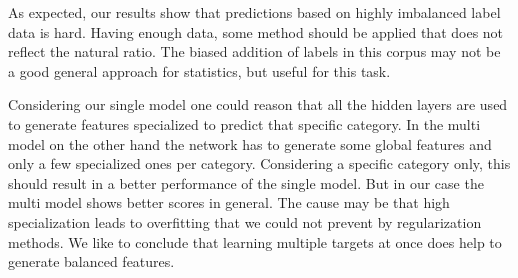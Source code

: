 \documentclass[11pt,a4paper]{article}
\begin{document}
As expected, our results show that predictions based on highly imbalanced label data is hard. Having enough data, some method should be applied that does not reflect the natural ratio. The biased addition of labels in this corpus may not be a good general approach for statistics, but useful for this task.

Considering our single model one could reason that all the hidden layers are used to generate features specialized to predict that specific category. 
In the multi model on the other hand the network has to generate some global features and only a few specialized ones per category. 
Considering a specific category only, this should result in a better performance of the single model.
But in our case the multi model shows better scores in general. 
The cause may be that high specialization leads to overfitting that we could not prevent by regularization methods.
We like to conclude that learning multiple targets at once does help to generate balanced features.




\appendix

\end{document}
